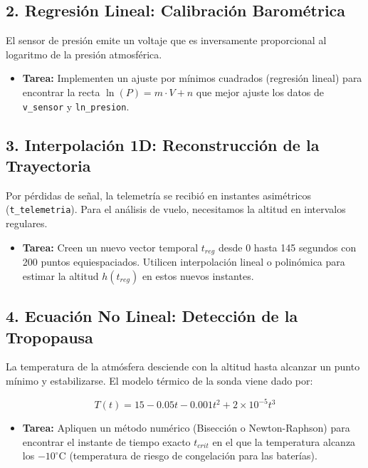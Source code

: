 	\subsection*{2. Regresión Lineal: Calibración Barométrica}
	
	El sensor de presión emite un voltaje que es inversamente proporcional al logaritmo de la presión atmosférica.
	
	\begin{itemize}
		\item \textbf{Tarea:} Implementen un ajuste por mínimos cuadrados (regresión lineal) para encontrar la recta $\ln(P) = m \cdot V + n$ que mejor ajuste los datos de \texttt{v\_sensor} y \texttt{ln\_presion}.
	\end{itemize}
	
	\subsection*{3. Interpolación 1D: Reconstrucción de la Trayectoria}
	
	Por pérdidas de señal, la telemetría se recibió en instantes asimétricos (\texttt{t\_telemetria}). Para el análisis de vuelo, necesitamos la altitud en intervalos regulares.
	
	\begin{itemize}
		\item \textbf{Tarea:} Creen un nuevo vector 
		temporal $t_{reg}$ desde 0 hasta 145 segundos con 200 puntos 
		equiespaciados. 
		Utilicen interpolación lineal o polinómica 
		 para estimar la altitud $h(t_{reg})$ en estos nuevos instantes.
	\end{itemize}
	
	\subsection*{4. Ecuación No Lineal: Detección de la Tropopausa}
	
	La temperatura de la atmósfera desciende con la altitud hasta alcanzar un punto mínimo y estabilizarse. El modelo térmico de la sonda viene dado por:
	
	\[
	T(t) = 15 - 0.05t - 0.001t^2 + 2 \times 10^{-5}t^3
	\]
	
	\begin{itemize}
		\item \textbf{Tarea:} Apliquen un método numérico (Bisección o Newton-Raphson) para encontrar el instante de tiempo exacto $t_{crit}$ en el que la temperatura alcanza los $-10^\circ \text{C}$ (temperatura de riesgo de congelación para las baterías).
	\end{itemize}
	
